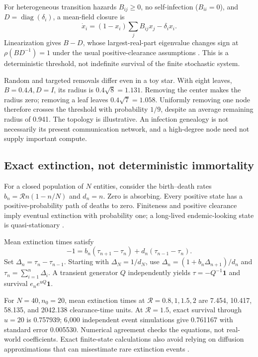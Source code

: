 \documentclass[10pt,twocolumn]{article}
\newcommand{\R}{\mathcal R}
\begin{document}
For heterogeneous transition hazards $B_{ij}\ge0$, no self-infection ($B_{ii}=0$), and $D=\operatorname{diag}(\delta_i)$, a mean-field closure is
\begin{equation}
\dot x_i=(1-x_i)\sum_jB_{ij}x_j-\delta_i x_i.
\end{equation}
Linearization gives $B-D$, whose largest-real-part eigenvalue changes sign at $\rho(BD^{-1})=1$ under the usual positive-clearance assumptions \citep{network}. This is a deterministic threshold, not indefinite survival of the finite stochastic system.

Random and targeted removals differ even in a toy star. With eight leaves, $B=0.4A,D=I$, its radius is $0.4\sqrt8=1.131$. Removing the center makes the radius zero; removing a leaf leaves $0.4\sqrt7=1.058$. Uniformly removing one node therefore crosses the threshold with probability $1/9$, despite an average remaining radius of 0.941. The topology is illustrative. An infection genealogy is not necessarily its present communication network, and a high-degree node need not supply important compute.

\subsection{Exact extinction, not deterministic immortality}
For a closed population of $N$ entities, consider the birth--death rates $b_n=\R n(1-n/N)$ and $d_n=n$. Zero is absorbing. Every positive state has a positive-probability path of deaths to zero. Finiteness and positive clearance imply eventual extinction with probability one; a long-lived endemic-looking state is quasi-stationary \citep{doering}.

Mean extinction times satisfy
\begin{equation}
-1=b_n(\tau_{n+1}-\tau_n)+d_n(\tau_{n-1}-\tau_n).
\end{equation}
Set $\Delta_n=\tau_n-\tau_{n-1}$. Starting with $\Delta_N=1/d_N$, use $\Delta_n=(1+b_n\Delta_{n+1})/d_n$ and $\tau_n=\sum_{i=1}^n\Delta_i$. A transient generator $Q$ independently yields $\tau=-Q^{-1}\boldsymbol1$ and survival $e_n e^{uQ}\boldsymbol1$.

For $N=40,n_0=20$, mean extinction times at $\R=0.8,1,1.5,2$ are 7.454, 10.417, 58.135, and 2042.138 clearance-time units. At $\R=1.5$, exact survival through $u=20$ is 0.757939; 6,000 independent event simulations give 0.761167 with standard error 0.005530. Numerical agreement checks the equations, not real-world coefficients. Exact finite-state calculations also avoid relying on diffusion approximations that can misestimate rare extinction events \citep{doering}.
\end{document}
